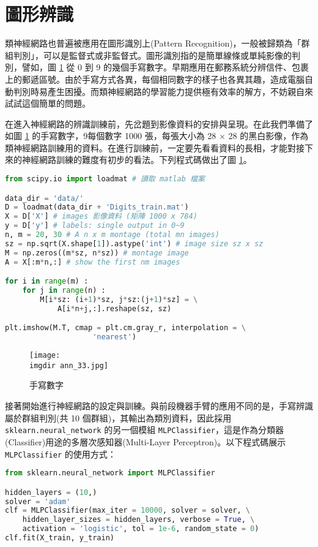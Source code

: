 \section{圖形辨識}
類神經網路也普遍被應用在圖形識別上(Pattern Recognition)，一般被歸類為「群組判別」，可以是監督式或非監督式。圖形識別指的是簡單線條或單純影像的判別，譬如，圖 \ref{fig:ann_16} 從 0 到 9 的幾個手寫數字。早期應用在郵務系統分辨信件、包裹上的郵遞區號。由於手寫方式各異，每個相同數字的樣子也各異其趣，造成電腦自動判別時易產生困擾。而類神經網路的學習能力提供極有效率的解方，不妨親自來試試這個簡單的問題。

在進入神經網路的辨識訓練前，先岔題到影像資料的安排與呈現。在此我們準備了如圖 \ref{fig:ann_16} 的手寫數字，9每個數字 1000 張，每張大小為 28 × 28 的黑白影像，作為類神經網路訓練用的資料。在進行訓練前，一定要先看看資料的長相，才能對接下來的神經網路訓練的難度有初步的看法。下列程式碼做出了圖 \ref{fig:ann_16}。
\bigskip
\begin{lstlisting}[language = Python]
from scipy.io import loadmat # 讀取 matlab 檔案

data_dir = 'data/'
D = loadmat(data_dir + 'Digits_train.mat')
X = D['X'] # images 影像資料 (矩陣 1000 x 784)
y = D['y'] # labels: single output in 0~9
n, m = 20, 30 # A n x m montage (total mn images)
sz = np.sqrt(X.shape[1]).astype('int') # image size sz x sz
M = np.zeros((m*sz, n*sz)) # montage image
A = X[:m*n,:] # show the first nm images

for i in range(m) :
    for j in range(n) :
        M[i*sz: (i+1)*sz, j*sz:(j+1)*sz] = \
            A[i*n+j,:].reshape(sz, sz)

plt.imshow(M.T, cmap = plt.cm.gray_r, interpolation = \
					'nearest')
\end{lstlisting}
\begin{figure}[H]
    \centering
        \texttt{[image: \\imgdir ann\_33.jpg]}
    \caption{手寫數字}
    \label{fig:ann_16}
\end{figure}

接著開始進行神經網路的設定與訓練。與前段機器手臂的應用不同的是，手寫辨識屬於群組判別(共 10 個群組)，其輸出為類別資料，因此採用 \verb|sklearn.neural_network| 的另一個模組 \verb|MLPClassifier|，這是作為分類器(Classifier)用途的多層次感知器(Multi-Layer Perceptron)。以下程式碼展示 \verb|MLPClassifier| 的使用方式：
\bigskip
\begin{lstlisting}[language = Python]
from sklearn.neural_network import MLPClassifier

hidden_layers = (10,)
solver = 'adam' 
clf = MLPClassifier(max_iter = 10000, solver = solver, \
	hidden_layer_sizes = hidden_layers, verbose = True, \
	activation = 'logistic', tol = 1e-6, random_state = 0)
clf.fit(X_train, y_train)
\end{lstlisting}

